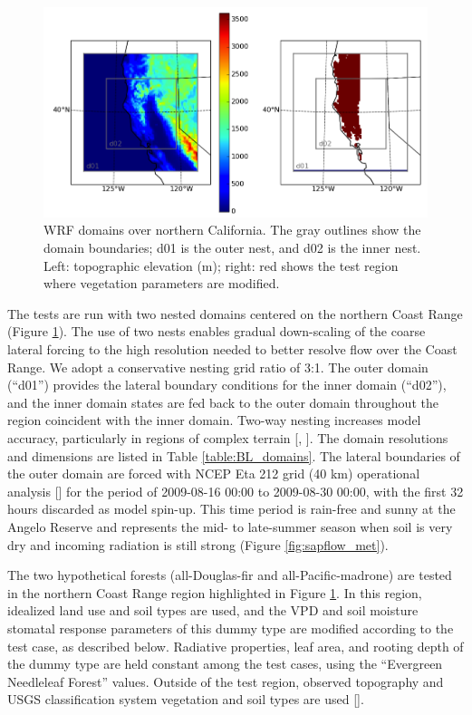 \begin{figure}[here]
\includegraphics[width=1\textwidth]{ch2-BL/figures/domain_map_cropped.png}
\caption{WRF domains over northern California.  The gray outlines show the domain boundaries; d01 is the outer nest, and d02 is the inner nest.  Left: topographic elevation (m); right: red shows the test region where vegetation parameters are modified.}
\label{fig:BL_domain}
\end{figure}

The tests are run with two nested domains centered on the northern Coast Range (Figure \ref{fig:BL_domain}).  The use of two nests enables gradual down-scaling of the coarse lateral forcing to the high resolution needed to better resolve flow over the Coast Range.  We adopt a conservative nesting grid ratio of 3:1.  The outer domain (``d01'') provides the lateral boundary conditions for the inner domain (``d02''), and the inner domain states are fed back to the outer domain throughout the region coincident with the inner domain.  Two-way nesting increases model accuracy, particularly in regions of complex terrain [\cite{harris2010idealized}, \cite{marjanovic2014}].  The domain resolutions and dimensions are listed in Table \ref{table:BL_domains}.  The lateral boundaries of the outer domain are forced with NCEP Eta 212 grid (40 km) operational analysis [\cite{ncep}] for the period of 2009-08-16 00:00 to 2009-08-30 00:00, with the first 32 hours discarded as model spin-up.  This time period is rain-free and sunny at the Angelo Reserve and represents the mid- to late-summer season when soil is very dry and incoming radiation is still strong (Figure \ref{fig:sapflow_met}).

The two hypothetical forests (all-Douglas-fir and all-Pacific-madrone) are tested in the northern Coast Range region highlighted in Figure \ref{fig:BL_domain}.  In this region, idealized land use and soil types are used, and the VPD and soil moisture stomatal response parameters of this dummy type are modified according to the test case, as described below.  Radiative properties, leaf area, and rooting depth of the dummy type are held constant among the test cases, using the ``Evergreen Needleleaf Forest'' values.  Outside of the test region, observed topography and USGS classification system vegetation and soil types are used [\cite{skamarock2008}].


